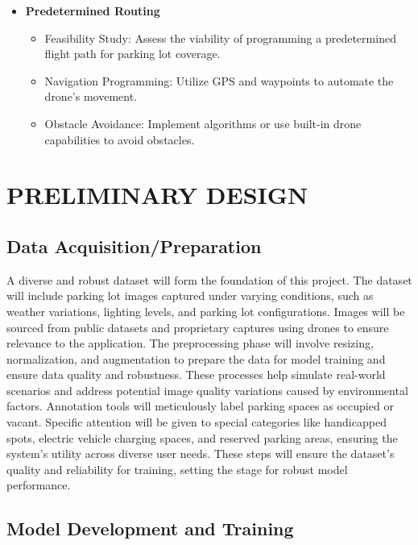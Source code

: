 \documentclass[conference]{IEEEtran}
\begin{document}
\begin{itemize}
\begin{itemize}
    \end{itemize}
    \item \textbf{Predetermined Routing}
    \begin{itemize}
        \item Feasibility Study: Assess the viability of programming a predetermined flight path for parking lot coverage.
        \item Navigation Programming: Utilize GPS and waypoints to automate the drone’s movement.
        \item Obstacle Avoidance: Implement algorithms or use built-in drone capabilities to avoid obstacles.
    \end{itemize}
\end{itemize}


\section{PRELIMINARY DESIGN}

\subsection{Data Acquisition/Preparation}

A diverse and robust dataset will form the foundation of this project. 
The dataset will include parking lot images captured under varying conditions, 
such as weather variations, 
lighting levels, 
and parking lot configurations. 
Images will be sourced from public datasets and proprietary captures using drones to ensure relevance to the application. 
The preprocessing phase will involve resizing, 
normalization, 
and augmentation to prepare the data for model training and ensure data quality and robustness. 
These processes help simulate real-world scenarios and address potential image quality variations caused by environmental factors. 
Annotation tools will meticulously label parking spaces as occupied or vacant. 
Specific attention will be given to special categories like handicapped spots, 
electric vehicle charging spaces, 
and reserved parking areas, 
ensuring the system’s utility across diverse user needs. 
These steps will ensure the dataset’s quality and reliability for training, 
setting the stage for robust model performance.

\subsection{Model Development and Training}
\end{document}
